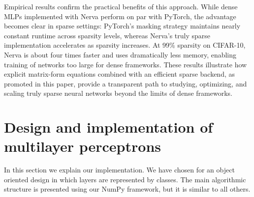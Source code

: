 \documentclass[twoside,11pt]{article}
\begin{document}
Empirical results confirm the practical benefits of this approach. While dense MLPs implemented with Nerva perform on par with PyTorch, the advantage becomes clear in sparse settings: PyTorch's masking strategy maintains nearly constant runtime across sparsity levels, whereas Nerva's truly sparse implementation accelerates as sparsity increases. At 99\% sparsity on CIFAR-10, Nerva is about four times faster and uses dramatically less memory, enabling training of networks too large for dense frameworks. These results illustrate how explicit matrix-form equations combined with an efficient sparse backend, as promoted in this paper, provide a transparent path to studying, optimizing, and scaling truly sparse neural networks beyond the limits of dense frameworks.


\section{Design and implementation of multilayer perceptrons} \label{section:design-implementation-mlps}
In this section we explain our implementation. We have chosen for an object oriented design in which
layers are represented by classes. The main algorithmic structure is presented using our NumPy framework, but it is similar to all others. 
\end{document}
